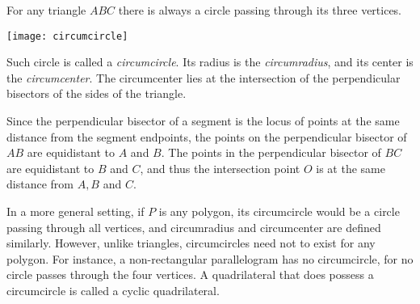 \documentclass[12pt]{article}
\begin{document}
For any triangle $ABC$ there is always
a circle passing through its three vertices.
\begin{center}
\texttt{[image: circumcircle]}
\end{center}

Such circle is called a \emph{circumcircle}.
Its radius is the \emph{circumradius},
and its center is the \emph{circumcenter}.
The circumcenter lies at the intersection
of the perpendicular bisectors of the sides of the triangle.

{\small
Since the perpendicular bisector of a segment
is the locus of points at the same distance from the segment endpoints,
the points on the perpendicular bisector of $AB$ are equidistant to $A$ and $B$.
The points in the perpendicular bisector of $BC$ are equidistant to $B$ and $C$,
and thus the intersection point $O$ is at the same distance from $A,B$ and $C$.}
\bigskip

In a more general setting, if $P$ is any polygon,
its circumcircle would be a circle passing through all vertices,
and circumradius and circumcenter are defined similarly.
However, unlike triangles, circumcircles need not to exist for any polygon.
For instance, a non-rectangular parallelogram has no circumcircle,
for no circle passes through the four vertices.
A quadrilateral that does possess a circumcircle
is called a cyclic quadrilateral.
\end{document}
